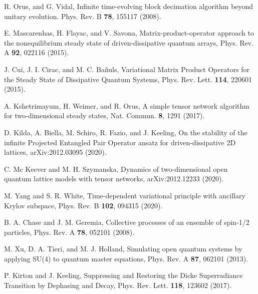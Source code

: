 \documentclass[pra,twocolumn,showpacs,preprintnumbers,amsmath,amssymb,superscriptaddress]{revtex4-1}
\begin{document}
\begin{thebibliography}{99}
     R. Orus, and G. Vidal, Infinite time-evolving block decimation algorithm beyond unitary evolution. Phys. Rev. B {\bf 78}, 155117 (2008).

     E. Mascarenhas, H. Flayac, and V. Savona, Matrix-product-operator approach to the nonequilibrium steady state of driven-dissipative quantum arrays, Phys. Rev. A {\bf 92}, 022116 (2015).
    
    J. Cui, J. I. Cirac, and M. C. Ba\~nuls, Variational Matrix Product Operators for the Steady State of Dissipative Quantum Systems, Phys. Rev. Lett. {\bf 114}, 220601 (2015).
    
      
    

 A. Kshetrimayum, H. Weimer, and R. Orus, A simple tensor network algorithm for two-dimensional steady states, Nat. Commun. {\bf 8}, 1291 (2017).


 D. Kilda, A. Biella, M. Schiro, R. Fazio, and J. Keeling, On the stability of the infinite Projected Entangled Pair Operator ansatz for driven-dissipative 2D lattices, arXiv:2012.03095 (2020).

 C. Mc Keever and M. H. Szymanska, Dynamics of two-dimensional open quantum lattice models with tensor networks, arXiv:2012.12233 (2020).

 M. Yang and S. R. White, Time-dependent variational principle with ancillary Krylov subspace, Phys. Rev. B {\bf 102}, 094315 (2020).


 B. A. Chase and J. M. Geremia, Collective processes of an ensemble of spin-1/2 particles, Phys. Rev. A {\bf 78}, 052101 (2008).

 M. Xu, D. A. Tieri, and M. J. Holland, Simulating open quantum systems by applying SU(4) to quantum master equations, Phys. Rev. A {\bf 87}, 062101 (2013).

 P. Kirton and J. Keeling, Suppressing and Restoring the Dicke Superradiance Transition by Dephasing and Decay, Phys. Rev. Lett. {\bf 118}, 123602 (2017).


\end{thebibliography}
\end{document}
